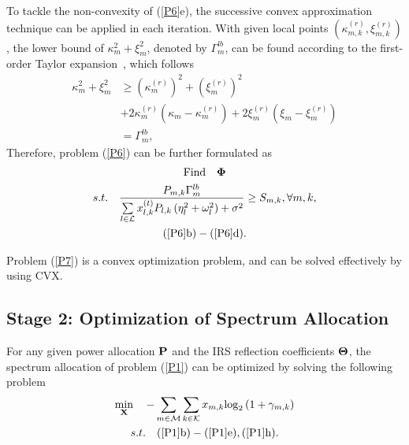 \documentclass[journal]{IEEEtran}
\begin{document}
To tackle the non-convexity of (\ref{P6}e), the successive convex approximation technique can be applied in each iteration. With given local points $ \left( {\kappa _{m,k}^{\left( r \right)},\xi _{m,k}^{\left( r \right)}} \right) $, the lower bound of $ \kappa _m^2 + \xi _m^2 $, denoted by $ \Gamma _m^{lb} $, can be found according to the first-order Taylor expansion~\cite{book-Convex}, which follows 
\begin{align}
	 \kappa _m^2 + \xi _m^2 &\ge {\left( {\kappa _m^{\left( r \right)}} \right)^2} + {\left( {\xi _m^{\left( r \right)}} \right)^2} \\
	 &+ 2\kappa _m^{\left( r \right)}\left( {{\kappa _m} - \kappa _m^{\left( r \right)}} \right) + 2\xi _m^{\left( r \right)}\left( {{\xi _m} - \xi _m^{\left( r \right)}} \right)\\
	 &= \Gamma _m^{lb} ,
\end{align} 
Therefore, problem (\ref{P6}) can be further formulated as
\begin{subequations}\label{P7}
	\begin{gather}
	{\rm{Find}}\quad{\bf{\Phi }}\\
	s.t. \quad \frac{{{P_{m,k}}\Gamma _m^{lb}}}{{\sum\limits_{l \in {\cal L}} {x_{l,k}^{\left( t \right)}{P_{l,k}}\left( {\eta _l^2 + \omega _l^2} \right)}  + {\sigma ^2}}} \ge {S_{m,k}},\forall m,k,\\
	(\ref{P6}\rm{b})-(\ref{P6}\rm{d}).
	\end{gather}
\end{subequations}

\noindent Problem (\ref{P7}) is a convex optimization problem, and can be solved effectively by using CVX.


\subsection{Stage 2: Optimization of Spectrum Allocation}
For any given power allocation $ \bf{P} $ and the IRS reflection coefficients $ \bf{\Theta} $, the spectrum allocation of problem (\ref{P1}) can be optimized by solving the following problem
\begin{subequations}\label{P8}
	\begin{gather}
	\mathop {\min }\limits_{\bf{X}}\quad-\sum\limits_{m \in {\cal M}} {\sum\limits_{k \in {\cal K}} {{x_{m,k}}{{\log }_2}\left( {1 + {\gamma _{m,k}}} \right)} } \\
	s.t.\quad (\ref{P1}\rm{b})-(\ref{P1}\rm{e}),(\ref{P1}h).
	\end{gather}
\end{subequations}
\end{document}
